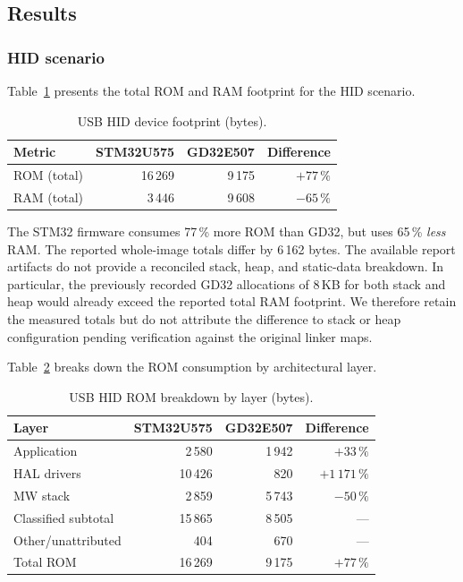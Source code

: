 \subsection{Results}
\label{sec:gd32-usb-results}

\subsubsection{HID scenario}
\label{sec:gd32-usb-hid}

Table~\ref{tab:gd32-usb-hid-footprint} presents the total ROM and RAM footprint for the
HID scenario.

\begin{table}[H]
  \centering
  \caption{USB HID device footprint (bytes).}
  \label{tab:gd32-usb-hid-footprint}
  \begin{tabular}{l r r r}
    \toprule
    \textbf{Metric} & \textbf{STM32U575} & \textbf{GD32E507} & \textbf{Difference} \\
    \midrule
    ROM (total) & 16\,269 & 9\,175  & $+77\,\%$ \\
    RAM (total) & 3\,446  & 9\,608  & $-65\,\%$ \\
    \bottomrule
  \end{tabular}
\end{table}

The STM32 firmware consumes 77\,\% more ROM than GD32, but uses 65\,\% \emph{less} RAM.
The reported whole-image totals differ by 6\,162 bytes. The available report artifacts do
not provide a reconciled stack, heap, and static-data breakdown. In particular, the
previously recorded GD32 allocations of 8\,KB for both stack and heap would already exceed
the reported total RAM footprint. We therefore retain the measured totals but do not
attribute the difference to stack or heap configuration pending verification against the
original linker maps.

Table~\ref{tab:gd32-usb-hid-rom} breaks down the ROM consumption by architectural layer.

\begin{table}[H]
  \centering
  \caption{USB HID ROM breakdown by layer (bytes).}
  \label{tab:gd32-usb-hid-rom}
  \begin{tabular}{l r r r}
    \toprule
    \textbf{Layer} & \textbf{STM32U575} & \textbf{GD32E507} & \textbf{Difference} \\
    \midrule
    Application    & 2\,580  & 1\,942 & $+33\,\%$ \\
    HAL drivers    & 10\,426 & 820    & $+1\,171\,\%$ \\
    MW stack       & 2\,859  & 5\,743 & $-50\,\%$ \\
    Classified subtotal & 15\,865 & 8\,505 & --- \\
    Other/unattributed  & 404 & 670 & --- \\
    \midrule
    Total ROM       & 16\,269 & 9\,175 & $+77\,\%$ \\
    \bottomrule
  \end{tabular}
\end{table}

